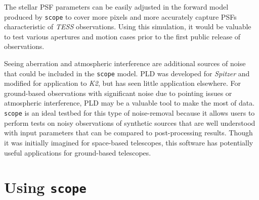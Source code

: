 \documentclass[12pt,preprint]{aastex}
\begin{document}
The stellar PSF parameters can be easily adjusted in the forward model produced by \texttt{scope} to cover more pixels and more accurately capture PSFs characteristic of \textit{TESS} observations. Using this simulation, it would be valuable to test various apertures and motion cases prior to the first public release of observations.

Seeing aberration and atmospheric interference are additional sources of noise that could be included in the \texttt{scope} model. PLD was developed for \textit{Spitzer} and modified for application to \textit{K2}, but has seen little application elsewhere. For ground-based observations with significant noise due to pointing issues or atmospheric interference, PLD may be a valuable tool to make the most of data. \texttt{scope} is an ideal testbed for this type of noise-removal because it allows users to perform tests on noisy observations of synthetic sources that are well understood with input parameters that can be compared to post-processing results. Though it was initially imagined for space-based telescopes, this software has potentially useful applications for ground-based telescopes.

\section{Using \texttt{scope}}
\end{document}

